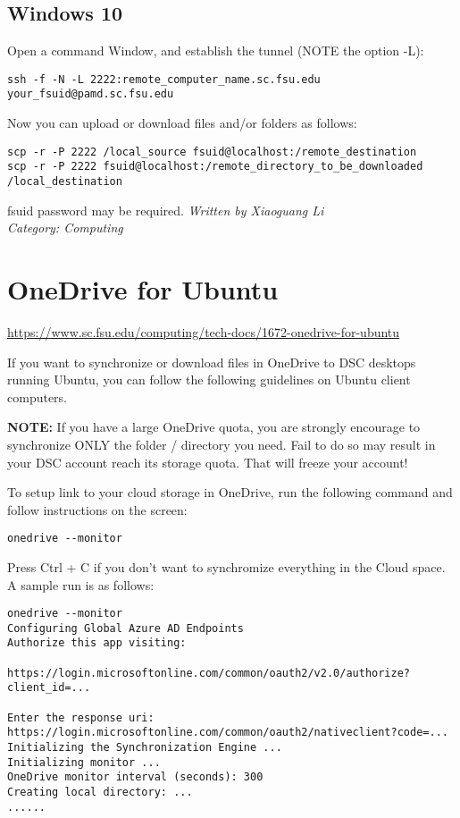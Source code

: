 \documentclass[12pt,a4paper]{article}
\begin{document}
\subsection*{Windows 10}
Open a command Window, and establish the tunnel (NOTE the option -L):
\begin{verbatim}
ssh -f -N -L 2222:remote_computer_name.sc.fsu.edu your_fsuid@pamd.sc.fsu.edu
\end{verbatim}
Now you can upload or download files and/or folders as follows:
\begin{verbatim}
scp -r -P 2222 /local_source fsuid@localhost:/remote_destination
scp -r -P 2222 fsuid@localhost:/remote_directory_to_be_downloaded /local_destination
\end{verbatim}
fsuid password may be required.
\hfill \textit{Written by Xiaoguang Li} \\
\hfill \textit{Category: Computing}

\section{OneDrive for Ubuntu}
\url{https://www.sc.fsu.edu/computing/tech-docs/1672-onedrive-for-ubuntu}

If you want to synchronize or download files in OneDrive to DSC desktops running Ubuntu, you can follow the following guidelines on Ubuntu client computers.

\textbf{NOTE:} If you have a large OneDrive quota, you are strongly encourage to synchronize ONLY the folder / directory you need. Fail to do so may result in your DSC account reach its storage quota. That will freeze your account!

To setup link to your cloud storage in OneDrive, run the following command and follow instructions on the screen:
\begin{verbatim}
onedrive --monitor
\end{verbatim}
Press Ctrl + C if you don't want to synchromize everything in the Cloud space.
A sample run is as follows:
\begin{verbatim}
onedrive --monitor
Configuring Global Azure AD Endpoints
Authorize this app visiting:

https://login.microsoftonline.com/common/oauth2/v2.0/authorize?client_id=...

Enter the response uri: https://login.microsoftonline.com/common/oauth2/nativeclient?code=...
Initializing the Synchronization Engine ...
Initializing monitor ...
OneDrive monitor interval (seconds): 300
Creating local directory: ...
......
\end{verbatim}
\end{document}
